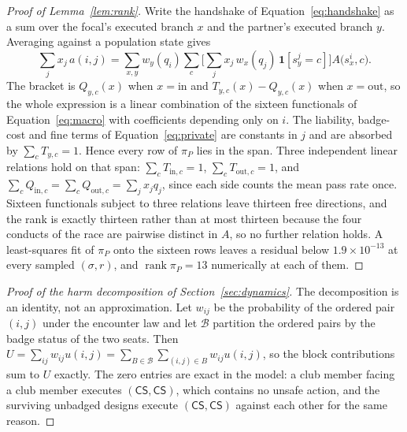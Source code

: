 \documentclass[11pt,a4paper]{article}
\newcommand{\CS}{\textsf{CS}}
\newcommand{\piP}{\pi_{P}}
\begin{document}
\begin{proof}[Proof of Lemma~\ref{lem:rank}]
Write the handshake of Equation~\eqref{eq:handshake} as a sum over the focal's
executed branch $x$ and the partner's executed branch $y$. Averaging against a
population state gives
\[
\sum_j x_j\,a(i,j)
 = \sum_{x, y} w_y(q_i) \sum_{c} \Big[\sum_j x_j\, w_x(q_j)\,
   \mathbf{1}[s^{j}_{y} = c]\Big] A\big(s^{i}_{x}, c\big).
\]
The bracket is $Q_{y,c}(x)$ when $x = \mathrm{in}$ and
$T_{y,c}(x) - Q_{y,c}(x)$ when $x = \mathrm{out}$, so the whole expression is a
linear combination of the sixteen functionals of Equation~\eqref{eq:macro} with
coefficients depending only on $i$. The liability, badge-cost and fine terms of
Equation~\eqref{eq:private} are constants in $j$ and are absorbed by
$\sum_c T_{y,c} = 1$. Hence every row of $\piP$ lies in the span. Three
independent linear relations hold on that span: $\sum_c T_{\mathrm{in},c} = 1$,
$\sum_c T_{\mathrm{out},c} = 1$, and
$\sum_c Q_{\mathrm{in},c} = \sum_c Q_{\mathrm{out},c} = \sum_j x_j q_j$, since
each side counts the mean pass rate once. Sixteen functionals subject to three
relations leave thirteen free directions, and the rank is exactly thirteen
rather than at most thirteen because the four conducts of the race are
pairwise distinct in $A$, so no further relation holds. A least-squares fit of
$\piP$ onto the sixteen rows leaves a residual below
$1.9 \times 10^{-13}$ at every sampled $(\sigma, r)$, and
$\operatorname{rank} \piP = 13$ numerically at each of them.
\end{proof}

\begin{proof}[Proof of the harm decomposition of Section~\ref{sec:dynamics}]
The decomposition is an identity, not an approximation. Let $w_{ij}$ be the
probability of the ordered pair $(i,j)$ under the encounter law and let
$\mathcal{B}$ partition the ordered pairs by the badge status of the two seats.
Then $U = \sum_{ij} w_{ij} u(i,j) = \sum_{B \in \mathcal{B}} \sum_{(i,j) \in B}
w_{ij} u(i,j)$, so the block contributions sum to $U$ exactly. The zero entries
are exact in the model: a club member facing a club member executes
$(\CS, \CS)$, which contains no unsafe action, and the surviving unbadged
designs execute $(\CS, \CS)$ against each other for the same reason.
\end{proof}



\end{document}
